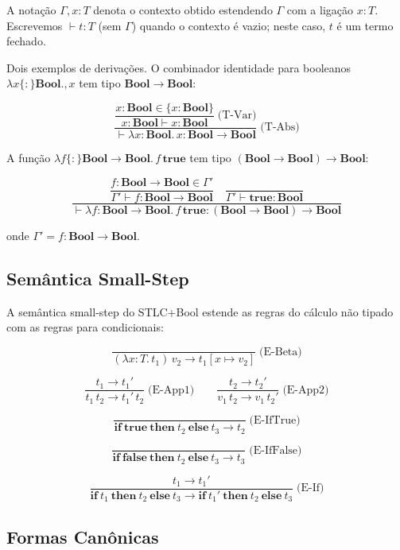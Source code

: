 A notação \(\Gamma, x : T\) denota o contexto obtido estendendo
\(\Gamma\) com a ligação \(x : T\). Escrevemos \(\vdash t : T\) (sem
\(\Gamma\)) quando o contexto é vazio; neste caso, \(t\) é um termo fechado.

Dois exemplos de derivações. O combinador identidade para booleanos
\(\lambda x \{:\} \mathbf{Bool}., x\) tem
tipo \(\mathbf{Bool} \to \mathbf{Bool}\):

\[ \dfrac{ \dfrac{x : \mathbf{Bool} \in \{x : \mathbf{Bool}\}} {x :
  \mathbf{Bool} \vdash x : \mathbf{Bool}} \;\text{(T-Var)} }{ \vdash \lambda x
  {:} \mathbf{Bool}.\, x : \mathbf{Bool} \to \mathbf{Bool} } \;\text{(T-Abs)}
\]

A função \(\lambda f \{:\} \mathbf{Bool} \to
  \mathbf{Bool}.\, f\,
\mathbf{true}\) tem tipo \((\mathbf{Bool}
\to \mathbf{Bool}) \to \mathbf{Bool}\):

\[ \dfrac{ \dfrac{f : \mathbf{Bool} \to \mathbf{Bool} \in \Gamma'} {\Gamma'
    \vdash f : \mathbf{Bool} \to \mathbf{Bool}} \quad \dfrac{}{\Gamma' \vdash
  \mathbf{true} : \mathbf{Bool}} }{ \vdash \lambda f {:} \mathbf{Bool} \to
    \mathbf{Bool}.\, f\, \mathbf{true} : (\mathbf{Bool} \to \mathbf{Bool}) \to
\mathbf{Bool} } \]

onde \(\Gamma' = f : \mathbf{Bool} \to \mathbf{Bool}\).

\subsection{Semântica Small-Step}

A semântica small-step do STLC+Bool estende as regras do cálculo não
tipado com as regras para condicionais:

\[ \dfrac{}{(\lambda x {:} T.\, t_1)\, v_2 \to t_1[x \mapsto v_2]}
\;\text{(E-Beta)} \]

\[ \dfrac{t_1 \to t_1'}{t_1\, t_2 \to t_1'\, t_2} \;\text{(E-App1)} \qquad
\dfrac{t_2 \to t_2'}{v_1\, t_2 \to v_1\, t_2'} \;\text{(E-App2)} \]

\[ \dfrac{}{\mathbf{if}\ \mathbf{true}\ \mathbf{then}\ t_2\ \mathbf{else}\ t_3
\to t_2} \;\text{(E-IfTrue)} \]

\[ \dfrac{}{\mathbf{if}\ \mathbf{false}\ \mathbf{then}\ t_2\ \mathbf{else}\ t_3
\to t_3} \;\text{(E-IfFalse)} \]

\[ \dfrac{t_1 \to t_1'} {\mathbf{if}\ t_1\ \mathbf{then}\ t_2\ \mathbf{else}\
  t_3 \to \mathbf{if}\ t_1'\ \mathbf{then}\ t_2\ \mathbf{else}\ t_3}
\;\text{(E-If)} \]

\subsection{Formas Canônicas}

